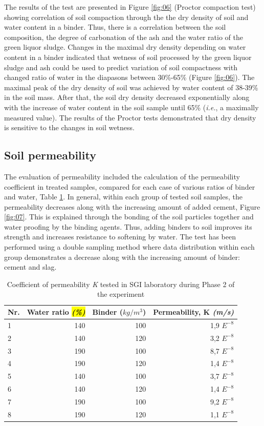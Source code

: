 \documentclass{amestyle}
\begin{document}
The results of the test are presented in Figure \ref{fig:06} (Proctor compaction test) showing correlation of soil compaction through the the dry density of soil and water content in a binder. Thus, there is a correlation between the soil composition, the degree of carbonation of the ash and the water ratio of the green liquor sludge. Changes in the maximal dry density depending on water content in a binder indicated that wetness of soil processed by the green liquor sludge and ash could be used to predict variation of soil compactness with changed ratio of water in the diapasons between 30\%-65\% (Figure \ref{fig:06}). The maximal peak of the dry density of soil was achieved by water content of 38-39\% in the soil mass. After that, the soil dry density decreased exponentially along with the increase of water content in the soil sample until 65\% (\emph{i.e.}, a maximally measured value). The results of the Proctor tests demonstrated that dry density is sensitive to the changes in soil wetness.

\subsection{Soil permeability}
 The evaluation of permeability included the calculation of the permeability coefficient in treated samples, compared for each case of various ratios of binder and water, Table \ref{tab:1}. In general, within each group of tested soil samples, the permeability decreases along with the increasing amount of added cement, Figure \ref{fig:07}. This is explained through the bonding of the soil particles together and water proofing by the binding agents. Thus, adding binders to soil improves its strength and increases resistance to softening by water. The test has been performed using a double sampling method where data distribution within each group demonstrates a decrease along with the increasing amount of binder: cement and slag. 

\begin{table}[htbp]
  \caption{Coefficient of permeability \emph{K} tested in SGI laboratory during Phase 2 of the experiment}
  \label{tab:1}
  \centering
  \begin{tabular}{| l | r | r | r |}
    \hline
    \multicolumn{1}{|c|}{Nr.} &
    \multicolumn{1}{|c|}{Water ratio \hl{\emph{(\%)}}} &
    \multicolumn{1}{|c|}{Binder ($kg/m^3$)} &
    \multicolumn{1}{|c|}{Permeability, K \emph{(m/s)}} \\\hline
    1 & 140 & 100 & 1,9 $E^{-8}$ \\
    2 & 140 & 120 & 3,2 $E^{-8}$ \\
    3 & 190 & 100 & 8,7 $E^{-8}$ \\
    4 & 190 & 120 & 1,4 $E^{-8}$ \\
    5 & 140 & 100 & 3,7 $E^{-8}$ \\
    6 & 140 & 120 & 1,4 $E^{-8}$ \\
    7 & 190 & 100 & 9,2 $E^{-8}$ \\
    8 & 190 & 120 & 1,1 $E^{-8}$ \\\hline
  \end{tabular}
\end{table}
\end{document}
